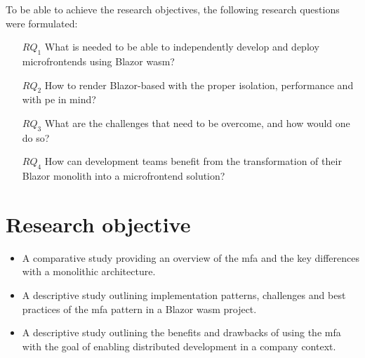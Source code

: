 
To be able to achieve the research objectives, the following research questions
were formulated:

\begin{itemize}
  \item[$RQ_1$] What is needed to be able to independently develop and deploy
  microfrontends using Blazor \gls{wasm}?
  \item[$RQ_2$] How to render Blazor-based  with the
  proper isolation, performance and with \gls{pe} in mind?
  \item[$RQ_3$] What are the challenges that need to be overcome, and how would
  one do so? 
  \item[$RQ_4$] How can development teams benefit from the transformation of
  their Blazor \gls{monolith} into a \gls{microfrontend} solution?
\end{itemize}

\section{Research objective}
\label{sec:research-objective}


\begin{itemize}
  \item A comparative study providing an overview of the \gls{mfa} and the key
  differences with a \gls{monolithic} architecture.
  \item A descriptive study outlining implementation patterns, challenges and
  best practices of the \gls{mfa} pattern in a Blazor \gls{wasm} project.
  \item A descriptive study outlining the benefits and drawbacks of using the
  \gls{mfa} with the goal of enabling distributed development in a company
  context.
\end{itemize}

